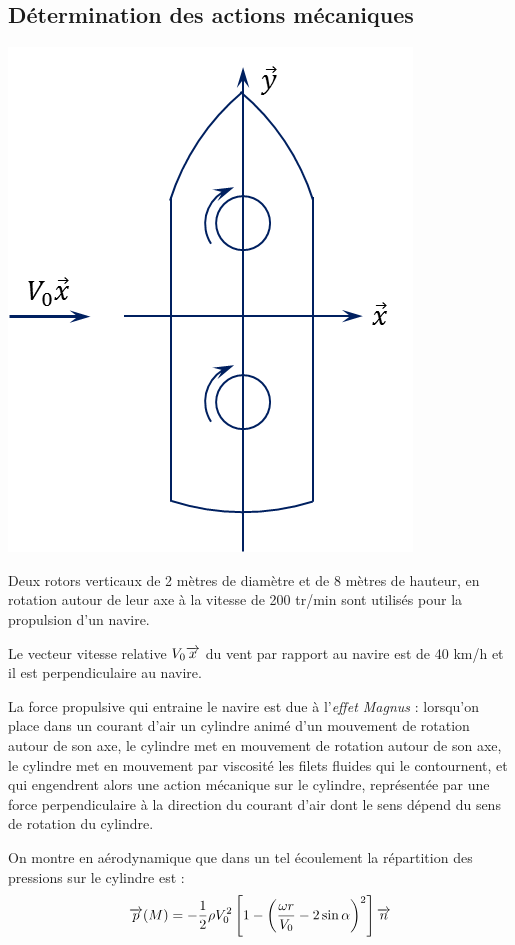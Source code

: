 \documentclass[10pt]{article}
\begin{document}
\subsection*{Détermination des actions mécaniques}
\setcounter{subparagraph}{0}
\begin{minipage}[c]{.3\linewidth}
\begin{center}
\includegraphics[width=.9\textwidth]{images/bateau}
\end{center}
\end{minipage} \hfill
\begin{minipage}[c]{.67\linewidth}
Deux rotors verticaux de 2 mètres de diamètre et de 8 mètres de hauteur, en rotation autour de leur axe à la vitesse de 200 tr/min sont utilisés pour la propulsion d'un navire. 

Le vecteur vitesse relative $V_0 \overrightarrow{x}$ du vent par rapport au navire est de 40 km/h et il est perpendiculaire au navire. 

La force propulsive qui entraine le navire est due à l'\textit{effet Magnus} : lorsqu'on place dans un courant d'air un cylindre animé d'un mouvement de rotation autour de son axe, le cylindre met en mouvement de rotation autour de son axe, le cylindre met en mouvement par viscosité les filets fluides qui le contournent, et qui engendrent alors une action mécanique sur le cylindre, représentée par une force perpendiculaire à la direction du courant d'air dont le sens dépend du sens de rotation du cylindre. 

On montre en aérodynamique que dans un tel écoulement la répartition des pressions sur le cylindre est :
$$
\overrightarrow{p}(M)=-\dfrac{1}{2}\rho V_0^2 \left[ 1-\left( \dfrac{\omega r}{V_0}-2\sin\alpha\right)^2\right]\overrightarrow{n}
$$

\end{minipage}
\end{document}
